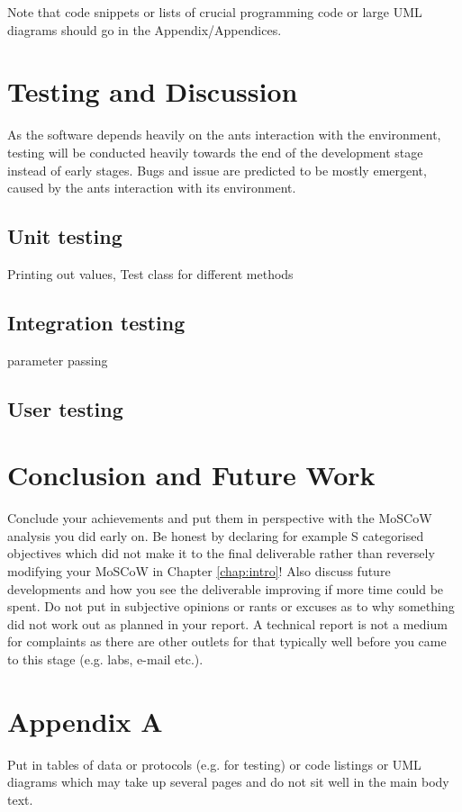 \documentclass[a4paper, oneside, 11pt]{report}
\begin{document}
Note that code snippets or lists of crucial programming code or large UML diagrams should go in the Appendix/Appendices.


\chapter{Testing and Discussion}
\label{chap:Testing}
As the software depends heavily on the ants interaction with the environment, testing will be conducted heavily towards the end of the development stage instead of early stages. Bugs and issue are predicted to be mostly emergent, caused by the ants interaction with its environment.

\section{Unit testing}
Printing out values, Test class for different methods

\section{Integration testing}
parameter passing

\section{User testing}

\chapter{Conclusion and Future Work}
\label{chap:conclusion}
Conclude your achievements and put them in perspective with the MoSCoW analysis you did early on. Be honest by declaring for example S categorised objectives which did not make it to the final deliverable rather than reversely modifying your MoSCoW in Chapter \ref{chap:intro}! Also discuss future developments and how you see the deliverable improving if more time could be spent. Do not put in subjective opinions or rants or excuses as to why something did not work out as planned in your report. A technical report is not a medium for complaints as there are other outlets for that typically well before you came to this stage (e.g. labs, e-mail etc.).





\chapter*{Appendix A}

Put in tables of data or protocols (e.g. for testing) or code listings or UML diagrams which may take up several pages and do not sit well in the main body text.
\end{document}
